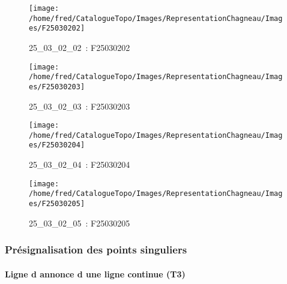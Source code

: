 \documentclass[12pt,titlepage,oneside]{book}
\begin{document}
\begin{figure}[h!]
  \hfill         %
  \begin{minipage}[t]{3cm}
    \begin{center}
      \texttt{[image: /home/fred/CatalogueTopo/Images/RepresentationChagneau/Images/F25030202]}
      \caption[~25\_03\_02\_02]{\small{25\_03\_02\_02~:} \tiny{F25030202}}\label{F25030202}
    \end{center}
  \end{minipage}
  \begin{minipage}[t]{3cm}
    \begin{center}
      \texttt{[image: /home/fred/CatalogueTopo/Images/RepresentationChagneau/Images/F25030203]}
      \caption[~25\_03\_02\_03]{\small{25\_03\_02\_03~:} \tiny{F25030203}}\label{F25030203}
    \end{center}
  \end{minipage}
  \begin{minipage}[t]{3cm}
    \begin{center}
      \texttt{[image: /home/fred/CatalogueTopo/Images/RepresentationChagneau/Images/F25030204]}
      \caption[~25\_03\_02\_04]{\small{25\_03\_02\_04~:} \tiny{F25030204}}\label{F25030204}
    \end{center}
  \end{minipage}
  \begin{minipage}[t]{3cm}
    \begin{center}
      \texttt{[image: /home/fred/CatalogueTopo/Images/RepresentationChagneau/Images/F25030205]}
      \caption[~25\_03\_02\_05]{\small{25\_03\_02\_05~:} \tiny{F25030205}}\label{F25030205}
    \end{center}
  \end{minipage}
\end{figure}

\subsubsection{\large Présignalisation des points singuliers}
\paragraph{Ligne d annonce d une ligne continue (T3)}
\noindent
\vspace{\baselineskip}
\end{document}
